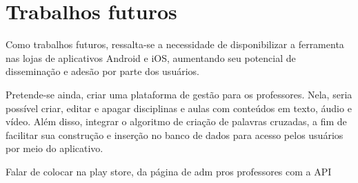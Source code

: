 \chapter{Trabalhos futuros} \label{sec:atividades_futuras}
Como trabalhos futuros, ressalta-se a necessidade de  disponibilizar a ferramenta nas lojas de aplicativos Android e iOS, aumentando seu potencial de disseminação e adesão por parte dos usuários.

Pretende-se ainda, criar uma plataforma de gestão para os professores. Nela, seria possível criar, editar e apagar disciplinas e aulas com conteúdos em texto, áudio e vídeo. Além disso, integrar o algoritmo de criação de palavras cruzadas, a fim de facilitar sua construção e inserção no banco de dados para acesso pelos usuários por meio do aplicativo.

Falar de colocar na play store, da página de adm pros professores  com a API


    

